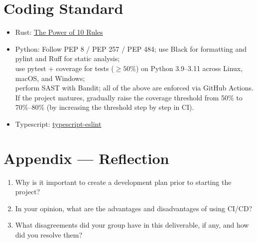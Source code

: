 \documentclass{article}
\begin{document}
\section{Coding Standard}

\begin{itemize}
  \item Rust:
        \href{https://en.wikipedia.org/wiki/The_Power_of_10:_Rules_for_Developing_Safety-Critical_Code}{The
          Power of 10 Rules}
  \item Python:
        Follow PEP 8 / PEP 257 / PEP 484; use Black for formatting and pylint and Ruff for static analysis; \\
        use pytest + coverage for tests ($\geq 50\%$) on Python 3.9–3.11 across Linux, macOS, and Windows; \\
        perform SAST with Bandit; all of the above are enforced via GitHub Actions.\\

        If the project matures, gradually raise the coverage threshold from 50\% to 70\%--80\% (by increasing the threshold step by step in CI).\\

  \item Typescript:
        \href{https://typescript-eslint.io/packages/typescript-eslint}{typescript-eslint}

\end{itemize}


\newpage{}

\section*{Appendix --- Reflection}




\begin{enumerate}
  \item Why is it important to create a development plan prior to starting the project?
  \item In your opinion, what are the advantages and disadvantages of using CI/CD?
  \item What disagreements did your group have in this deliverable, if any, and how did
        you resolve them?
\end{enumerate}

\newpage{}
\end{document}
